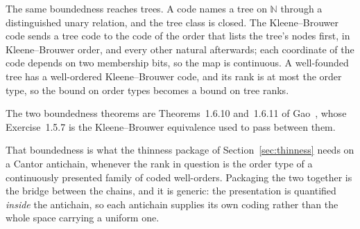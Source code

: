 
The same boundedness reaches trees.  A code names a tree on $\mathbb{N}$ through a
distinguished unary relation, and the tree class is closed.  The Kleene--Brouwer
code sends a tree code to the code of the order that lists the tree's nodes first,
in Kleene--Brouwer order, and every other natural afterwards; each coordinate of the
code depends on two membership bits, so the map is continuous.  A well-founded tree
has a well-ordered Kleene--Brouwer code, and its rank is at most the order type, so
the bound on order types becomes a bound on tree ranks.


The two boundedness theorems are Theorems~1.6.10 and~1.6.11 of Gao~\cite{gao2009},
whose Exercise~1.5.7 is the Kleene--Brouwer equivalence used to pass between them.

That boundedness is what the thinness package of Section~\ref{sec:thinness}
needs on a Cantor antichain, whenever the rank in question is the order type of
a continuously presented family of coded well-orders.  Packaging the two
together is the bridge between the chains, and it is generic: the presentation
is quantified \emph{inside} the antichain, so each antichain supplies its own
coding rather than the whole space carrying a uniform one.




